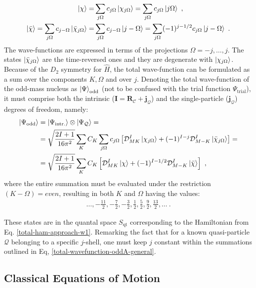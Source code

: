 \begin{align}
    \ket{\chi}=&\sum_{j\Omega}c_{j\Omega}\ket{\chi_{j\Omega}}=\sum_{j\Omega}c_{j\Omega}\ket{j\Omega}\ ,\nonumber\\
    \ket{\bar{\chi}}=\sum_{j\Omega}c_{j-\Omega}\ket{\bar{\chi}_{j\Omega}}=&\sum_{j\Omega}c_{j-\Omega}\ket{j-\Omega}=\sum_{j\Omega}(-1)^{j-1/2}c_{j\Omega}\ket{j-\Omega}\ .
    \label{j-Omega-single-particle-states}
\end{align}
The wave-functions are expressed in terms of the projections $\Omega=-j,\dots,j$. The states $\ket{\bar{\chi}_{j\Omega}}$ are the time-reversed ones and they are degenerate with $\ket{\chi_{j\Omega}}$. Because of the $D_2$ symmetry for $\hat{H}$, the total wave-function can be formulated as a sum over the components $K, \Omega$ and over $j$. Denoting the total wave-function of the odd-mass nucleus as $\ket{\Psi}_\text{odd}$ (not to be confused with the trial function $\Psi_\text{trial}$), it must comprise both the intrinsic ($\mathbf{I}=\mathbf{R}_\mathscr{C}+\mathbf{j}_\mathcal{Q}$) and the single-particle ($\mathbf{j}_\mathcal{Q}$) degrees of freedom, namely:
\begin{align}
    \ket{\Psi_\text{odd}}&=\ket{\Psi_\text{intr.}}\otimes\ket{\Psi_\mathcal{Q}}=\nonumber\\
    &=\sqrt{\frac{2I+1}{16\pi^2}}\sum_K C_K\sum_{j\Omega}c_{j\Omega}\left[\mathcal{D}_{MK}^I\ket{\chi_{j\Omega}}+(-1)^{I-j}\mathcal{D}_{M-K}^I\ket{\bar{\chi}_{j\Omega}}\right]=\nonumber\\
    &=\sqrt{\frac{2I+1}{16\pi^2}}\sum_K C_K \left[\mathcal{D}_{MK}^I\ket{\chi}+(-1)^{I-1/2}\mathcal{D}_{M-K}^I\ket{\bar{\chi}}\right]\ ,
    \label{total-wavefunction-oddA-general}
\end{align}
where the entire summation must be evaluated under the restriction $(K-\Omega)=even$, resulting in both $K$ and $\Omega$ having the values:
\begin{align}
    \dots,-\frac{11}{2},-\frac{7}{2},-\frac{3}{2},\frac{1}{2},\frac{5}{2},\frac{9}{2},\frac{13}{2},\dots\ .
\end{align}

These states are in the quantal space $S_\text{qt}$ corresponding to the Hamiltonian from Eq. \ref{total-ham-approach-w1}. Remarking the fact that for a known quasi-particle $\mathcal{Q}$ belonging to a specific $j$-shell, one must keep $j$ constant within the summations outlined in Eq, \ref{total-wavefunction-oddA-general}.

\subsection{Classical Equations of Motion}
\label{equations-of-motion-section}

